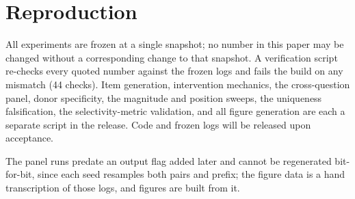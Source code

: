 \documentclass[11pt]{article}
\begin{document}
\section{Reproduction}
\label{sec:appendix-reproduction}

All experiments are frozen at a single snapshot; no number in this paper may
be changed without a corresponding change to that snapshot. A verification
script re-checks every quoted number against the frozen logs and fails the
build on any mismatch (44 checks). Item generation, intervention mechanics,
the cross-question panel, donor specificity, the magnitude and position
sweeps, the uniqueness falsification, the selectivity-metric validation, and
all figure generation are each a separate script in the release. Code and
frozen logs will be released upon acceptance.

The panel runs predate an output flag added later and cannot be regenerated
bit-for-bit, since each seed resamples both pairs and prefix; the figure data
is a hand transcription of those logs, and figures are built from it.
\end{document}
